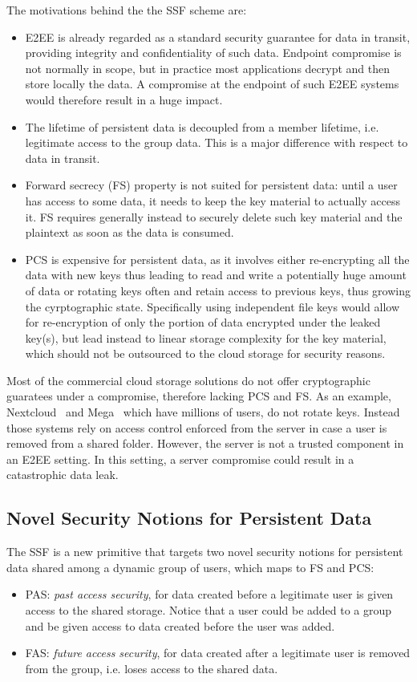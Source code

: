 The motivations behind the the SSF scheme are:
\begin{itemize}
    \item E2EE is already regarded as a standard security guarantee for data in transit, providing integrity and confidentiality of such data. Endpoint compromise is not normally in scope, but in practice most applications decrypt and then store locally the data. A compromise at the endpoint of such E2EE systems would therefore result in a huge impact.
    \item The lifetime of persistent data is decoupled from a member lifetime, i.e. legitimate access to the group data. This is a major difference with respect to data in transit.
    \item Forward secrecy (FS) property is not suited for persistent data: until a user has access to some data, it needs to keep the key material to actually access it. FS requires generally instead to securely delete such key material and the plaintext as soon as the data is consumed. 
    \item PCS is expensive for persistent data, as it involves either re-encrypting all the data with new keys thus leading to read and write a potentially huge amount of data or rotating keys often and retain access to previous keys, thus growing the cyrptographic state. Specifically using independent file keys would allow for re-encryption of only the portion of data encrypted under the leaked key(s), but lead instead to linear storage complexity for the key material, which should not be outsourced to the cloud storage for security reasons.
\end{itemize}

Most of the commercial cloud storage solutions do not offer cryptographic guaratees under a compromise,
therefore lacking PCS and FS. As an example, Nextcloud~\cite{2017NextcloudE2EEnc} and Mega~\cite{Mega}
which have millions of users, do not rotate keys. 
Instead those systems rely on access control enforced from the server
in case a user is removed from a shared folder.
However, the server is not a trusted component in an E2EE setting.
In this setting, a server compromise could result in a catastrophic data leak.

\subsection{Novel Security Notions for Persistent Data}

The SSF is a new primitive that targets two 
novel security notions for persistent data shared among a dynamic 
group of users, which maps to FS and PCS:
\begin{itemize}
    \item PAS: \textit{past access security}, for data created before a legitimate user is given access to the shared storage. Notice that a user could be added to a group and be given access to data created before the user was added.
    \item FAS: \textit{future access security}, for data created after a legitimate user is removed from the group, i.e. loses access to the shared data.
\end{itemize}

